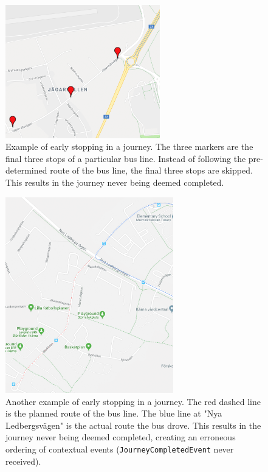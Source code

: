 \begin{figure}[t!]
    \centering
    \includegraphics[width=0.6\textwidth]{figures/edge_case_early_quit}
    \caption{Example of early stopping in a journey.
    The three markers are the final three stops of a particular bus line.
    Instead of following the pre-determined route of the bus line, the final three stops are skipped.
    This results in the journey never being deemed completed.}
    \label{fig:human-error-early-stopping-1}
\end{figure}

\begin{figure}[t!]
    \centering
    \includegraphics[width=0.65\textwidth]{figures/lazy_driver_2}
    \caption{Another example of early stopping in a journey.
    The red dashed line is the planned route of the bus line.
    The blue line at "Nya Ledbergsvägen" is the actual route the bus drove.
    This results in the journey never being deemed completed, creating an erroneous ordering of contextual events (\texttt{JourneyCompletedEvent} never received).}
    \label{fig:human-error-early-stopping-2}
\end{figure}

